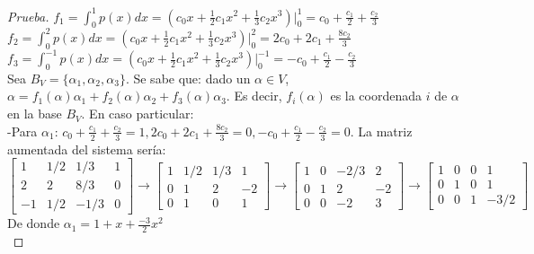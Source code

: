 \documentclass[12pt]{article}
\begin{document}
\begin{proof} [Prueba]
$f_{1}=\int_{0}^{1}p(x)dx 
  = (c_{0}x+\frac{1}{2}c_{1}x^{2}+\frac{1}{3}c_{2}x^{3})|_{0}^{1}
  = c_{0} + \frac{c_{1}}{2} + \frac{c_{2}}{3}$\\
  
$f_{2}=\int_{0}^{2}p(x)dx 
  = (c_{0}x+\frac{1}{2}c_{1}x^{2}+\frac{1}{3}c_{2}x^{3})|_{0}^{2}
  = 2c_{0} + 2c_{1} + \frac{8c_{2}}{3}$\\

$f_{3}=\int_{0}^{-1}p(x)dx 
  = (c_{0}x+\frac{1}{2}c_{1}x^{2}+\frac{1}{3}c_{2}x^{3})|_{0}^{-1}
  = -c_{0} + \frac{c_{1}}{2} - \frac{c_{2}}{3}$\\

Sea $B_{V}=\{\alpha_{1}, \alpha_{2}, \alpha_{3}\}$. Se sabe que: dado un $\alpha \in V$, $\alpha=f_{1}(\alpha)\alpha_{1} + f_{2}(\alpha)\alpha_{2} + f_{3}(\alpha)\alpha_{3}$. Es decir, $f_{i}(\alpha)$ es la coordenada $i$ de $\alpha$ en la base $B_{V}$. En caso particular:\\

-Para $\alpha_{1}$: $c_{0} + \frac{c_{1}}{2} + \frac{c_{2}}{3}=1,
	2c_{0} + 2c_{1} + \frac{8c_{2}}{3} = 0,
	-c_{0} + \frac{c_{1}}{2} - \frac{c_{2}}{3} = 0
$. La matriz aumentada del sistema sería:\\

$
  \left[\begin{array}{rrr|r}
    1	& 1/2 	& 1/3 	& 1 \\
    2	& 2 	& 8/3 	& 0 \\
    -1	& 1/2 	& -1/3 	& 0 
  \end{array}\right]
  \rightarrow 
  \left[\begin{array}{rrr|r}
    1	& 1/2 	& 1/3 	& 1 \\
    0	& 1 	& 2 	& -2 \\
    0	& 1 	& 0 	& 1 
  \end{array}\right]
  \rightarrow
  \left[\begin{array}{rrr|r}
    1	& 0 	& -2/3 	& 2 \\
    0	& 1 	& 2 	& -2 \\
    0	& 0 	& -2 	& 3 
  \end{array}\right]
  \rightarrow
  \left[\begin{array}{rrr|r}
    1	& 0 	& 0 	& 1 \\
    0	& 1 	& 0 	& 1 \\
    0	& 0 	& 1 	& -3/2 
  \end{array}\right]   
$\\
De donde $\alpha_{1} = 1 + x + \frac{-3}{2}x^{2}$\\


\end{proof}
\end{document}
